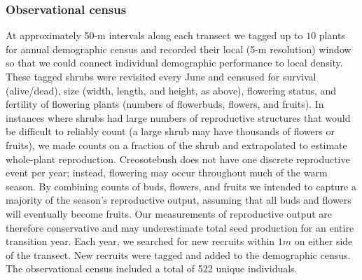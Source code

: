 \documentclass[11pt]{article}\usepackage[]{graphicx}\usepackage[usenames,dvipsnames]{xcolor}
\begin{document}
\subsubsection*{Observational census}
At approximately 50-m intervals along each transect we tagged up to $10$ plants for annual demographic census and recorded their local (5-m resolution) window so that we could connect individual demographic performance to local density. 
These tagged shrubs were revisited every June and censused for survival (alive/dead), size (width, length, and height, as above), flowering status, and fertility of flowering plants (numbers of flowerbuds, flowers, and fruits). 
In instances where shrubs had large numbers of reproductive structures that would be difficult to reliably count (a large shrub may have thousands of flowers or fruits), we made counts on a fraction of the shrub and extrapolated to estimate whole-plant reproduction. 
Creosotebush does not have one discrete reproductive event per year; instead, flowering may occur throughout much of the warm season. 
By combining counts of buds, flowers, and fruits we intended to capture a majority of the season's reproductive output, assuming that all buds and flowers will eventually become fruits. 
Our measurements of reproductive output are therefore conservative and may underestimate total seed production for an entire transition year. 
Each year, we searched for new recruits within $1m$ on either side of the transect.
New recruits were tagged and added to the demographic census. 
The observational census included a total of 522 unique individuals. 
\end{document}

